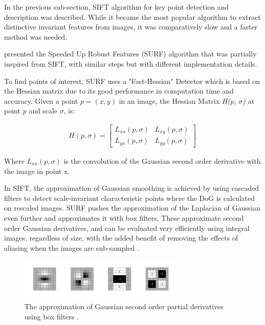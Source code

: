 \documentclass{l4proj}
\begin{document}
In the previous sub-section, SIFT algorithm for key point detection and description was described. While it became the most popular algorithm to extract distinctive invariant features from images, it was comparatively slow and a faster method was needed.

\citet{Bay08} presented the Speeded Up Robust Features (SURF) algorithm that was partially inspired from SIFT, with similar steps but with different implementation details. 

To find points of interest, SURF uses a "Fast-Hessian" Detector which is based on the Hessian matrix due to its good performance in computation time and accuracy. Given a point $p=(x,y)$ in an image, the Hessian Matrix \textit{H(p, $\sigma$)} at point \textit{p} and scale \textit{$\sigma$}, is: 

\begin{align}
 H(p,\sigma) = \begin{bmatrix}L_{xx}(p, \sigma) &L_{xy}(p, \sigma)  \\L_{yx}(p, \sigma) & L_{yy}(p, \sigma) \end{bmatrix}
\end{align}


Where $L_{xx}(p, \sigma)$ is the convolution of the Gaussian second order derivative with the image in point x. 

In SIFT, the approximation of Gaussian smoothing is achieved by using cascaded filters to detect scale-invariant characteristic points where the DoG is calculated on rescaled images. SURF pushes the approximation of the Laplacian of Gaussian even further and approximates it with box filters. These approximate second order Gaussian derivatives, and can be evaluated very efficiently using integral images, regardless of size, with the added benefit of removing the effects of aliasing when the images are sub-sampled \citep{Bay08}.





\begin{figure}[ht]
    \centering
    \includegraphics[width=0.7\textwidth]{l4template-master/images/boxfilters.png}
    \caption{The approximation of Gaussian second order partial derivatives using box filters \citep{Bay08}.}
    \label{boxfilters}
\end{figure}
\end{document}
